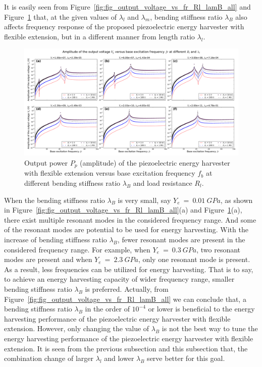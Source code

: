 \documentclass{elsarticle}
\begin{document}
It is easily seen from Figure~\ref{fig:fig_output_voltage_vs_fr_Rl_lamB_all} and Figure~\ref{fig:fig_output_power_vs_fr_Rl_lamB_all} that, at the given values of $\lambda_l$ and $\lambda_m$, bending stiffness ratio $\lambda_B$ also affects frequency response of the proposed piezoelectric energy harvester with flexible extension, but in a different manner from length ratio $\lambda_l$. 

\begin{figure}[!htbp]
    \centering
    \includegraphics[width=\textwidth]{./fig_output_power_vs_fr_Rl_lamB_all}
    \caption{Output power $P_p$ (amplitude) of the piezoelectric energy harvester with flexible extension versus base excitation frequency $f_b$ at different bending stiffness ratio $\lambda_B$ and load resistance $R_l$. \color{red}{to be revised in the legend. change figure title} }
    \label{fig:fig_output_power_vs_fr_Rl_lamB_all}
\end{figure}


When the bending stiffness ratio $\lambda_B$ is very small, say $Y_e\ =\ 0.01\ GPa$, as shown in Figure~\ref{fig:fig_output_voltage_vs_fr_Rl_lamB_all}(a) and Figure~\ref{fig:fig_output_power_vs_fr_Rl_lamB_all}(a), there exist multiple resonant modes in the considered frequency range. And some of the resonant modes are potential to be used for energy harvesting. With the increase of bending stiffness ratio $\lambda_B$, fewer resonant modes are present in the considered frequency range. For example, when $Y_e\ =\ 0.3\ GPa$, two resonant modes are present and when $Y_e\ =\ 2.3\ GPa$, only one resonant mode is present. As a result, less frequencies can be utilized for energy harvesting. That is to say, to achieve an energy harvesting capacity of wider frequency range, smaller bending stiffness ratio $\lambda_B$ is preferred. Actually, from Figure~\ref{fig:fig_output_voltage_vs_fr_Rl_lamB_all} we can conclude that, a bending stiffness ratio $\lambda_B$ in the order of $10^{-4}$ or lower is beneficial to the energy harvesting performance of the piezoelectric energy harvester with flexible extension. However, only changing the value of $\lambda_B$ is not the best way to tune the energy harvesting performance of the piezoelectric energy harvester with flexible extension. It is seen from the previous subsection and this subsection that, the combination change of larger $\lambda_l$ and lower $\lambda_B$ serve better for this goal.
\end{document}

